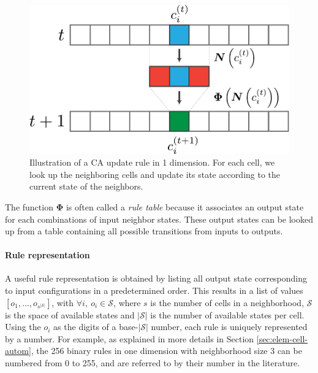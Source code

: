 \begin{figure}[htbp]
  \centering
 \includegraphics[width=.7\linewidth]{figures/ca_base}
  \caption{Illustration of a \acl{CA} update rule in 1 dimension. For each cell,
  we look up the neighboring cells and update its state according to the current
state of the neighbors.}
  \label{fig:ca_base}
\end{figure}

The function $\boldsymbol{\Phi}$ is often called a \emph{rule table} because it
associates an output state for each combinations of input neighbor states. These
output states can be looked up from a table containing all possible transitions
from inputs to outputs.

\paragraph{Rule representation}
A useful rule representation is obtained by listing all output state
corresponding to input configurations in a predetermined order. This results in
a list of values $[o_1, \ldots, o_{s^{|\mathcal{S}|}}]$, with $\forall i,\ o_{i} \in \mathcal{S}$, where $s$ is
the number of cells in a neighborhood, $\mathcal{S}$ is the space of available states and
$|\mathcal{S}|$ is the number of available states per cell. Using the $o_{i}$ as the
digits of a base-$|\mathcal{S}|$ number, each rule is uniquely represented by a number.
For example, as explained in more details in Section \ref{sec:elem-cell-autom},
the 256 binary rules in one dimension with neighborhood size 3 can be numbered from
0 to 255, and are referred to by their number in the literature.

